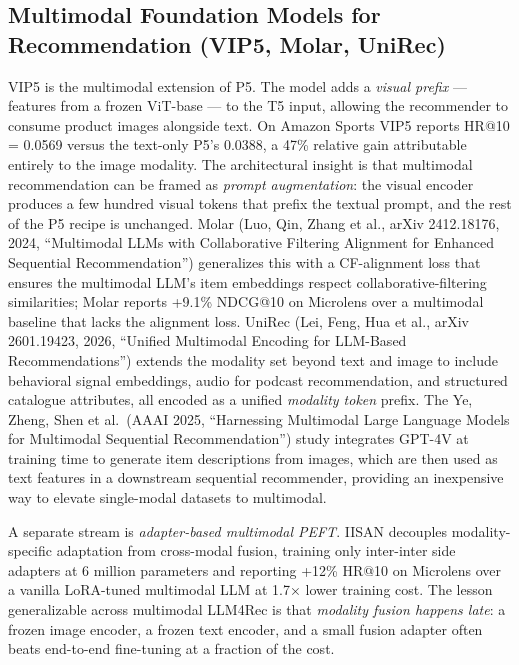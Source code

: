 \documentclass{article}
\begin{document}
\subsection{Multimodal Foundation Models for Recommendation (VIP5, Molar, UniRec)}\label{multimodal-foundation-models-for-recommendation-vip5-molar-unirec}

VIP5 \citep{geng2023vip5towardsmultimo} is the multimodal extension of P5. The model adds a \emph{visual prefix} --- features from a frozen ViT-base --- to the T5 input, allowing the recommender to consume product images alongside text. On Amazon Sports VIP5 reports HR@10 = 0.0569 versus the text-only P5's 0.0388, a 47\% relative gain attributable entirely to the image modality. The architectural insight is that multimodal recommendation can be framed as \emph{prompt augmentation}: the visual encoder produces a few hundred visual tokens that prefix the textual prompt, and the rest of the P5 recipe is unchanged. Molar (Luo, Qin, Zhang et al., arXiv 2412.18176, 2024, ``Multimodal LLMs with Collaborative Filtering Alignment for Enhanced Sequential Recommendation'') generalizes this with a CF-alignment loss that ensures the multimodal LLM's item embeddings respect collaborative-filtering similarities; Molar reports +9.1\% NDCG@10 on Microlens over a multimodal baseline that lacks the alignment loss. UniRec (Lei, Feng, Hua et al., arXiv 2601.19423, 2026, ``Unified Multimodal Encoding for LLM-Based Recommendations'') extends the modality set beyond text and image to include behavioral signal embeddings, audio for podcast recommendation, and structured catalogue attributes, all encoded as a unified \emph{modality token} prefix. The Ye, Zheng, Shen et al.~(AAAI 2025, ``Harnessing Multimodal Large Language Models for Multimodal Sequential Recommendation'') study integrates GPT-4V at training time to generate item descriptions from images, which are then used as text features in a downstream sequential recommender, providing an inexpensive way to elevate single-modal datasets to multimodal.

A separate stream is \emph{adapter-based multimodal PEFT}. IISAN \citep{fu2024iisanefficientlyad} decouples modality-specific adaptation from cross-modal fusion, training only inter-inter side adapters at 6 million parameters and reporting +12\% HR@10 on Microlens over a vanilla LoRA-tuned multimodal LLM at 1.7× lower training cost. The lesson generalizable across multimodal LLM4Rec is that \emph{modality fusion happens late}: a frozen image encoder, a frozen text encoder, and a small fusion adapter often beats end-to-end fine-tuning at a fraction of the cost.
\end{document}
